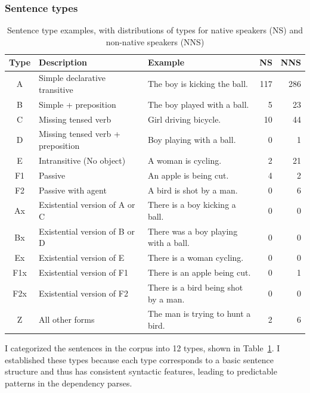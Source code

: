 \subsubsection{Sentence types}

\begin{table}[htb!]
\begin{center}
\begin{tabular}{|c|l|l|r|r|}
\hline
Type & Description & Example & NS & NNS \\
\hline
 A & Simple declarative transitive & The boy is kicking the ball. & 117 & 286 \\
 \hline
 B & Simple + preposition & The boy played with a ball. & 5 & 23 \\
 \hline
 C & Missing tensed verb & Girl driving bicycle. & 10 & 44 \\
 \hline
 D & Missing tensed verb + preposition & Boy playing with a ball. & 0 & 1 \\
 \hline
 E & Intransitive (No object) & A woman is cycling. & 2 & 21 \\
 \hline
 F1 & Passive & An apple is being cut. & 4 & 2 \\
 \hline
 F2 & Passive with agent & A bird is shot by a man. & 0 & 6 \\
 \hline
 Ax & Existential version of A or C & There is a boy kicking a ball. & 0 & 0 \\
 \hline
 Bx & Existential version of B  or D & There was a boy playing with a ball. & 0 & 0 \\
 \hline
 Ex & Existential version of E & There is a woman cycling. & 0 & 0 \\
 \hline
 F1x & Existential version of F1 & There is an apple being cut. & 0 & 1 \\
 \hline
 F2x & Existential version of F2 & There is a bird being shot by a man. & 0 & 0 \\
 \hline
 Z & All other forms & The man is trying to hunt a bird. & 2 & 6 \\
 \hline
\end{tabular}
\end{center}
\caption{Sentence type examples, with distributions of types for
  native speakers (NS) and non-native speakers (NNS)}
\label{tab:sentence-type}
\end{table}

I categorized the sentences in the corpus into 12 types, shown in
Table~\ref{tab:sentence-type}. I established these types because each
type corresponds to a basic sentence structure and thus has consistent
syntactic features, leading to predictable patterns in the dependency
parses.

